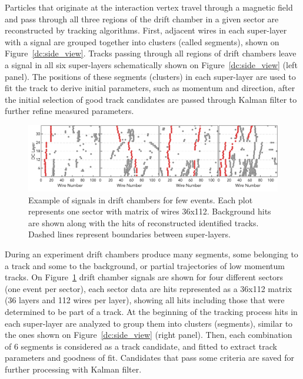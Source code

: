 Particles that originate at the interaction vertex travel through a magnetic field and pass through all three regions of the drift chamber in a given sector are reconstructed by tracking algorithms. First, adjacent  wires in each super-layer with a signal are grouped together into clusters (called segments), shown on Figure~\ref{dc:side_view}. Tracks passing through all regions of drift chambers leave a signal in all six super-layers schematically shown on Figure~\ref{dc:side_view} (left panel).  The positions of these segments (clusters) in each super-layer are used to fit the track to derive initial parameters, such as momentum and direction, after the initial selection of good track candidates are passed through Kalman filter to further refine measured parameters.

\begin{figure}[!ht]
\begin{center}
 \includegraphics[width=6.2in]{images/figure_dc_examples.pdf}
\caption {Example of signals in drift chambers for few events. Each plot represents one sector with matrix of wires 36x112. Background hits are shown along with the hits of reconstructed identified tracks. Dashed lines represent boundaries between super-layers.}
 \label{dc:events_sector}
 \end{center}
\end{figure}

During an experiment drift chambers produce many segments, some belonging to a track and some to the background, or partial trajectories of low momentum tracks. On Figure~\ref{dc:events_sector} drift chamber signals are shown for four different sectors (one event per sector), each sector data are hits represented as a 36x112 matrix (36 layers and 112 wires per layer), showing all hits including those that were determined to be part of a track. At the beginning of the tracking process hits in each super-layer are analyzed to group them into clusters (segments), similar to the ones shown on Figure~\ref{dc:side_view} (right panel). Then, each combination of 6 segments is considered as a track candidate, and fitted to extract track parameters and goodness of fit. Candidates that pass some criteria are saved for further processing with Kalman filter. 

